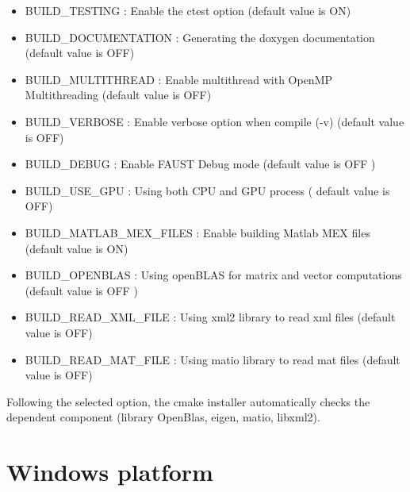 \begin{itemize}
\item BUILD\_TESTING : Enable the ctest option (default value is ON)
\item BUILD\_DOCUMENTATION : Generating the doxygen documentation (default value is OFF)  
\item BUILD\_MULTITHREAD : Enable multithread with OpenMP Multithreading (default value is OFF)
\item BUILD\_VERBOSE : Enable verbose option when compile (-v) (default value is OFF)
\item BUILD\_DEBUG : Enable FAUST Debug mode (default value is OFF )
\item BUILD\_USE\_GPU : Using both CPU and GPU process ( default value is OFF)
\item BUILD\_MATLAB\_MEX\_FILES : Enable building Matlab MEX files (default value is ON)
\item BUILD\_OPENBLAS : Using openBLAS for matrix and vector computations (default value is OFF )
\item BUILD\_READ\_XML\_FILE : Using xml2 library to read xml files (default value is OFF)
\item BUILD\_READ\_MAT\_FILE : Using matio library to read mat files (default value is OFF)
\end{itemize}

Following the selected option, the cmake installer automatically checks the dependent component (library OpenBlas, eigen, matio, libxml2).  


\section{Windows platform}\label{sec:WinInstall}


